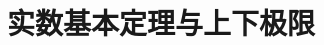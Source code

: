 \documentclass[../main.tex]{subfiles} %
\begin{document}
\chapter{实数基本定理与上下极限}





% 

% 

% 

% 

% 

% 

% 

% 
\end{document}
